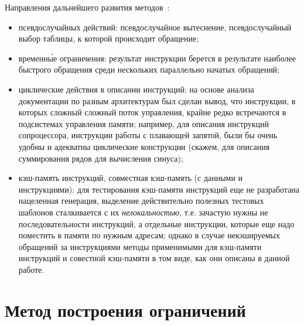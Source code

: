 Направления дальнейшего развития методов~\cite{my_ewdts_2009}:
\begin{itemize}
    \item псевдослучайных действий: псевдослучайное вытеснение, псевдослучайный
выбор таблицы, к которой происходит обращение;
    \item временн\'{ы}е ограничения: результат инструкции берется в результате
наиболее быстрого обращения среди нескольких параллельно начатых обращений;
    \item циклические действия в описании инструкций: на основе анализа
документации по разным архитектурам был сделан вывод, что инструкции, в которых
сложный сложный поток управления, крайне редко встречаются в подсистемах
управления памяти; например, для описания инструкций сопроцессора, инструкции
работы с плавающей запятой, были бы очень удобны и адекватны циклические
конструкции (скажем, для описания суммирования рядов для вычисления синуса);
    \item кэш-память инструкций, совместная кэш-память (с данными и
инструкциями): для тестирования кэш-памяти инструкций еще не разработана
нацеленная генерация, выделение действительно полезных тестовых шаблонов
сталкивается с их \emph{нелокальностью}, т.е. зачастую нужны не
последовательности инструкций, а отдельные инструкции, которые еще надо
поместить в памяти по нужным адресам; однако в случае некэшируемых обращений за инструкциями методы применимыми для кэш-памяти инструкций и совестной кэш-памяти в том виде, как они описаны в данной работе.
\end{itemize}

\section{Метод построения ограничений}\label{sec:constraints_generation_section}

